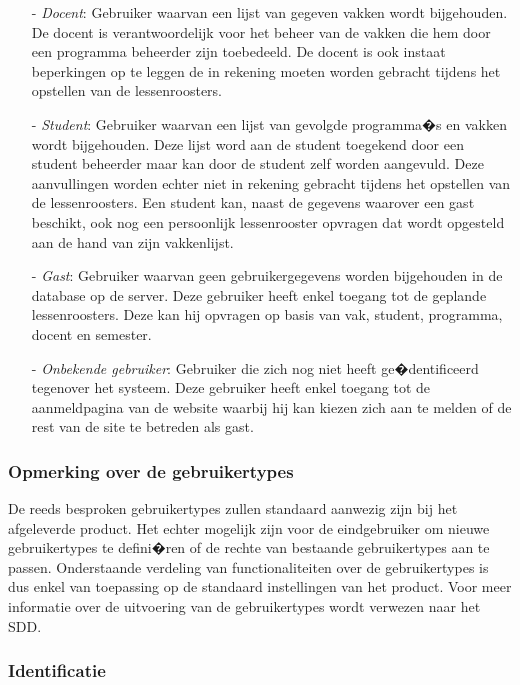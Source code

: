 \documentclass{article}
\begin{document}
\begin{itemize}
\item[-] \textit{Docent}: Gebruiker waarvan een lijst van gegeven vakken wordt bijgehouden. De docent is verantwoordelijk voor het beheer van de vakken die hem door een programma beheerder zijn toebedeeld. De docent is ook instaat beperkingen op te leggen de in rekening moeten worden gebracht tijdens het opstellen van de lessenroosters.
\item[-] \textit{Student}: Gebruiker waarvan een lijst van gevolgde programma�s en vakken wordt bijgehouden. Deze lijst word aan de student toegekend door een student beheerder maar kan door de student zelf worden aangevuld. Deze aanvullingen worden echter niet in rekening gebracht tijdens het opstellen van de lessenroosters. Een student kan, naast de gegevens waarover een gast beschikt, ook nog een persoonlijk lessenrooster opvragen dat  wordt opgesteld aan de hand van zijn vakkenlijst.
\item[-] \textit{Gast}: Gebruiker waarvan geen gebruikergegevens worden bijgehouden in de database op de server. Deze gebruiker heeft enkel toegang tot de geplande lessenroosters. Deze kan hij opvragen op basis van vak, student, programma, docent en semester.
\item[-] \textit{Onbekende gebruiker}: Gebruiker die zich nog niet heeft ge�dentificeerd tegenover het systeem. Deze gebruiker heeft enkel toegang tot de aanmeldpagina van de website waarbij hij kan kiezen zich aan te melden of de rest van de site te betreden als gast.
\end{itemize}

\subsubsection{Opmerking over de gebruikertypes}
De reeds besproken gebruikertypes zullen standaard aanwezig zijn bij het afgeleverde product. Het echter mogelijk zijn voor de eindgebruiker om nieuwe gebruikertypes te defini�ren of de rechte van bestaande gebruikertypes aan te passen. Onderstaande verdeling van functionaliteiten over de gebruikertypes is dus enkel van toepassing op de standaard instellingen van het product. Voor meer informatie over de uitvoering van de gebruikertypes wordt verwezen naar het SDD.

\subsubsection{Identificatie}
\end{document}

